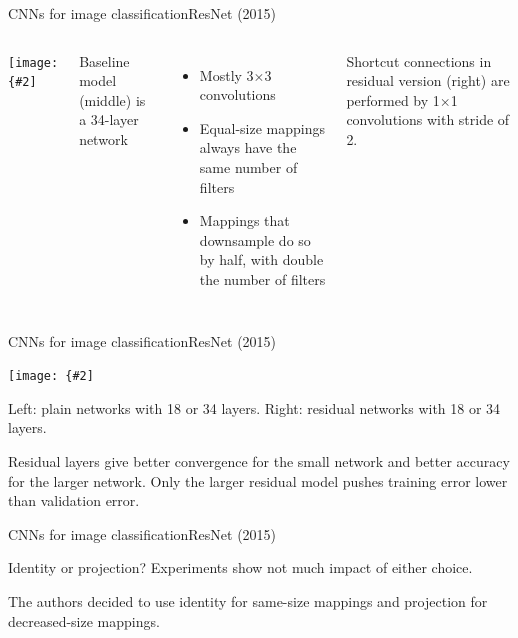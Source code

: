 \documentclass{beamer}
\newcommand{\myfig}[3]{\centerline{\texttt{[image: \{\#2]}}}
\begin{document}
\begin{frame}{CNNs for image classification}{ResNet (2015)}

  \begin{columns}

    \column{1.4in}
    
    \myfig{1.2in}{he-fig3}{He et al.\ (2016), Fig.\ 3}

    \column{3.1in}

    Baseline model (middle) is a 34-layer network
    \begin{itemize}
    \item Mostly 3$\times$3 convolutions
    \item Equal-size mappings always have the same number of filters
    \item Mappings that downsample do so by half, with double the
      number of filters
    \end{itemize}

    \medskip

    Shortcut connections in residual version (right) are performed
    by 1$\times$1 convolutions with stride of 2.
    
  \end{columns}

\end{frame}


\begin{frame}{CNNs for image classification}{ResNet (2015)}

  \myfig{4in}{he-fig4}{He et al.\ (2016), Fig.\ 4}

  \medskip

  Left: plain networks with 18 or 34 layers. Right: residual networks
  with 18 or 34 layers.

  \medskip

  Residual layers give better convergence for the small network and
  better accuracy for the larger network. Only the larger residual
  model pushes training error lower than validation error.
  
\end{frame}


\begin{frame}{CNNs for image classification}{ResNet (2015)}

  Identity or projection? Experiments show not much impact of either
  choice.

  \medskip

  The authors decided to use identity for same-size mappings
  and projection for decreased-size mappings.

\end{frame}
\end{document}
